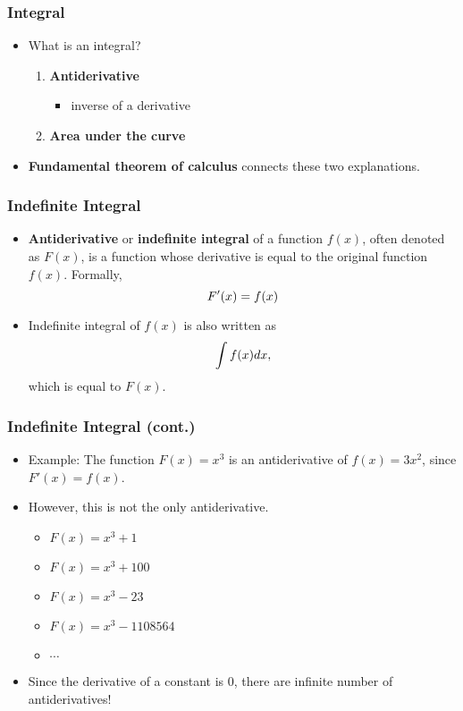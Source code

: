 \documentclass[pdflatex, 12pt]{beamer}
\begin{document}
\begin{frame}
\frametitle{Integral}
\begin{itemize}
\item What is an integral?
 \begin{enumerate}
 \item \textbf{Antiderivative}
  \begin{itemize}
  \item inverse of a derivative
  \end{itemize}
 \item \textbf{Area under the curve}
 \end{enumerate}
\vspace{0.4cm}
\item \textbf{Fundamental theorem of calculus} connects these two explanations.
\end{itemize}
\end{frame}

\begin{frame}
\frametitle{Indefinite Integral}
\begin{itemize}
\item \textbf{Antiderivative} or \textbf{indefinite integral} of a function $f(x)$, often denoted as $F(x)$, is a function whose derivative is equal to the original function $f(x)$. Formally,
 \begin{equation}
 F'(x) = f(x) \notag 
 \end{equation} 
\item Indefinite integral of $f(x)$ is also written as 
 \begin{equation}
 \int f(x) dx, \notag 
 \end{equation}
which is equal to $F(x)$. 
\end{itemize}
\end{frame}

\begin{frame}
\frametitle{Indefinite Integral (cont.)}
\begin{itemize}
\item Example: The function $F(x) = x^3$ is an antiderivative of $f(x) = 3x^2$, since $F'(x) = f(x)$.
\vspace{0.4cm}
\item However, this is not the only antiderivative.
 \begin{itemize}
 \item $F(x) = x^3 + 1$
 \item $F(x) = x^3 + 100$
 \item $F(x) = x^3 - 23$
 \item $F(x) = x^3 - 1108564$
 \item $\cdots$
 \end{itemize}
\vspace{0.4cm}
\item Since the derivative of a constant is 0, there are infinite number of antiderivatives!
\end{itemize}	
\end{frame}
\end{document}
